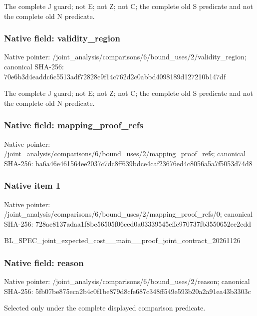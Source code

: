 \documentclass[10pt,a4paper]{article}
\begin{document}
The complete J guard; not E; not Z; not C; the complete old S predicate and not the complete old N predicate.


\subsubsection{Native field: validity\_region}


Native pointer: /joint\_analysis/comparis\allowbreak{}ons/6/bound\_uses/2/valid\allowbreak{}ity\_region; canonical SHA-256: 70e6b3d4eaddc6c5513adf72\allowbreak{}828c9f14c762d2c0abbd4098\allowbreak{}189d127210b147df


The complete J guard; not E; not Z; not C; the complete old S predicate and not the complete old N predicate.


\subsubsection{Native field: mapping\_proof\_refs}


Native pointer: /joint\_analysis/comparis\allowbreak{}ons/6/bound\_uses/2/mappi\allowbreak{}ng\_proof\_refs; canonical SHA-256: ba6a46e461564ee2037c7dc8\allowbreak{}ff639bdce4caf23676ed4c80\allowbreak{}56a5a7f5053d74d8



\subsubsection{Native item 1}


Native pointer: /joint\_analysis/comparis\allowbreak{}ons/6/bound\_uses/2/mappi\allowbreak{}ng\_proof\_refs/0; canonical SHA-256: 728ae8137adaa1f8be56505f\allowbreak{}06ced0a03339545effe97073\allowbreak{}7fb3550652ee2cdd


BL\_SPEC\_joint\_expected\_c\allowbreak{}ost\_\_main\_\_proof\_joint\_c\allowbreak{}ontract\_20261126


\subsubsection{Native field: reason}


Native pointer: /joint\_analysis/comparis\allowbreak{}ons/6/bound\_uses/2/reaso\allowbreak{}n; canonical SHA-256: 5fb07be875eca2b4c0f1be87\allowbreak{}9d8cfe687c348ff549e593b2\allowbreak{}0a2a91ea43b3303c


Selected only under the complete displayed comparison predicate.
\end{document}
